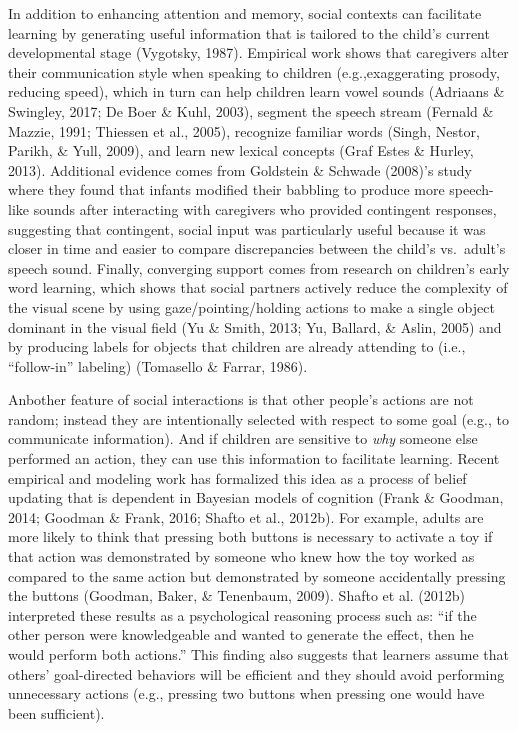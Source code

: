 \documentclass[oneside]{report}
\begin{document}
In addition to enhancing attention and memory, social contexts can
facilitate learning by generating useful information that is tailored to
the child's current developmental stage (Vygotsky, 1987). Empirical work
shows that caregivers alter their communication style when speaking to
children (e.g.,exaggerating prosody, reducing speed), which in turn can
help children learn vowel sounds (Adriaans \& Swingley, 2017; De Boer \&
Kuhl, 2003), segment the speech stream (Fernald \& Mazzie, 1991;
Thiessen et al., 2005), recognize familiar words (Singh, Nestor, Parikh,
\& Yull, 2009), and learn new lexical concepts (Graf Estes \& Hurley,
2013). Additional evidence comes from Goldstein \& Schwade (2008)'s
study where they found that infants modified their babbling to produce
more speech-like sounds after interacting with caregivers who provided
contingent responses, suggesting that contingent, social input was
particularly useful because it was closer in time and easier to compare
discrepancies between the child's vs.~adult's speech sound. Finally,
converging support comes from research on children's early word
learning, which shows that social partners actively reduce the
complexity of the visual scene by using gaze/pointing/holding actions to
make a single object dominant in the visual field (Yu \& Smith, 2013;
Yu, Ballard, \& Aslin, 2005) and by producing labels for objects that
children are already attending to (i.e., ``follow-in'' labeling)
(Tomasello \& Farrar, 1986).

Anbother feature of social interactions is that other people's actions
are not random; instead they are intentionally selected with respect to
some goal (e.g., to communicate information). And if children are
sensitive to \emph{why} someone else performed an action, they can use
this information to facilitate learning. Recent empirical and modeling
work has formalized this idea as a process of belief updating that is
dependent in Bayesian models of cognition (Frank \& Goodman, 2014;
Goodman \& Frank, 2016; Shafto et al., 2012b). For example, adults are
more likely to think that pressing both buttons is necessary to activate
a toy if that action was demonstrated by someone who knew how the toy
worked as compared to the same action but demonstrated by someone
accidentally pressing the buttons (Goodman, Baker, \& Tenenbaum, 2009).
Shafto et al. (2012b) interpreted these results as a psychological
reasoning process such as: ``if the other person were knowledgeable and
wanted to generate the effect, then he would perform both actions.''
This finding also suggests that learners assume that others'
goal-directed behaviors will be efficient and they should avoid
performing unnecessary actions (e.g., pressing two buttons when pressing
one would have been sufficient).
\end{document}
